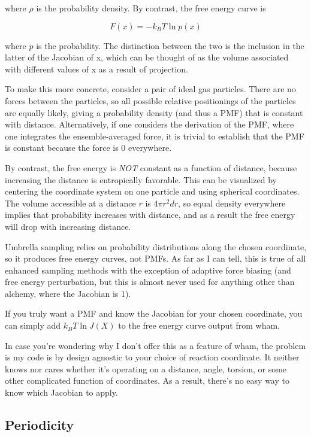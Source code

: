 \documentclass[12pt]{article}
\begin{document}
\noindent
where $\rho$ is the probability density. By contrast, the free energy curve is

\begin{equation}
    F(x) = -k_B T \ln p(x)
\end{equation}

\noindent
where $p$ is the probability. The distinction between the two is the inclusion
in the latter of the Jacobian of x, which can be thought of as the volume
associated with different values of x as a result of projection.

To make this more concrete, consider a pair of ideal gas particles. There are no
forces between the particles, so all possible relative positionings of the
particles are equally likely, giving a probability density (and thus a PMF) that
is constant with distance. Alternatively, if one considers the derivation of the
PMF, where one integrates the ensemble-averaged force, it is trivial to
establish that the PMF is constant because the force is 0 everywhere.

By contrast, the free energy is \emph{NOT} constant as a function of distance,
because increasing the distance is entropically favorable. This can be
visualized by centering the coordinate system on one particle and using
spherical coordinates. The volume accessible at a distance $r$ is $4 \pi r^2
dr$, so equal density everywhere implies that probability increases with
distance, and as a result the free energy will drop with increasing distance.

Umbrella sampling relies on probability distributions along the chosen
coordinate, so it produces free energy curves, not PMFs. As far as I can tell, this
is true of all enhanced sampling methods with the exception of adaptive force
biasing (and free energy perturbation, but this is almost never used for
anything other than alchemy, where the Jacobian is 1).

If you truly want a PMF and know the Jacobian for your chosen coordinate, you
can simply add $k_B T \ln J(X)$ to the free energy curve output from wham.

In case you're wondering why I don't offer this as a feature of wham, the
problem is my code is by design agnostic to your choice of reaction coordinate.
It neither knows nor cares whether it's operating on a distance, angle, torsion,
or some other complicated function of coordinates. As a result, there's no easy
way to know which Jacobian to apply.


\subsection{Periodicity}
\end{document}
